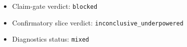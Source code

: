 \begin{itemize}
\item Claim-gate verdict: \texttt{blocked}
\item Confirmatory slice verdict: \texttt{inconclusive_underpowered}
\item Diagnostics status: \texttt{mixed}
\end{itemize}
